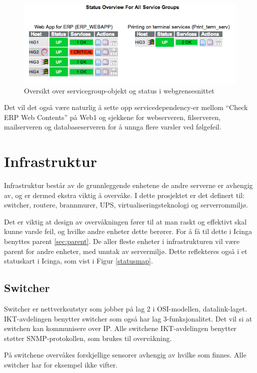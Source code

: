 \begin{figure}[H]
    \centering
    \includegraphics[scale=0.6]{img/servicegroup_web}
    \caption{ Oversikt over servicegroup-objekt og status i webgrensesnittet}
    \label{servicegroup_web}
\end{figure}
Det vil det også være naturlig å sette opp servicedependency-er mellom ``Check ERP Web Contents'' på Web1 og sjekkene for webserveren, filserveren, mailserveren og databaseserveren for å unnga flere varsler ved følgefeil.

\section{Infrastruktur}
Infrastruktur består av de grunnleggende enhetene de andre serverne er avhengig av, og er dermed ekstra viktig å overvåke. I dette prosjektet er det definert til: switcher, routere, brannmurer, UPS, virtualiseringsteknologi og serverrommiljø.

Det er viktig at design av overvåkningen fører til at man raskt og effektivt skal kunne varsle feil, og hvilke andre enheter dette berører. For å få til dette i Icinga benyttes parent \ref{sec:parent}. De aller fleste enheter i infrastrukturen vil være parent for andre enheter, med unntak av servermiljø. Dette reflekteres også i et statuskart i Icinga, som vist i Figur \ref{statusmap}.

\subsection{Switcher}\label{sec:switch}
Switcher er nettverksutstyr som jobber på lag 2 i OSI-modellen, datalink-laget. IKT-avdelingen benytter switcher som også har lag 3-funksjonalitet. Det vil si at switchen kan kommunisere over IP. Alle switchene IKT-avdelingen benytter støtter SNMP-protokollen, som brukes til overvåkning.

På switchene overvåkes forskjellige sensorer avhengig av hvilke som finnes. Alle switcher har for eksempel ikke vifter. 

